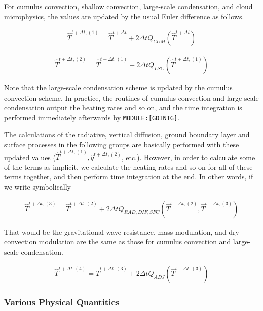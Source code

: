 For cumulus convection, shallow convection, large-scale condensation, and cloud microphysics, the values are updated by the usual Euler difference as follows.

\begin{eqnarray}
  \hat{T}^{t+\Delta t,(1)} = \hat{T}^{t+\Delta t}
                         +  2 \Delta t Q_{CUM}(\hat{T}^{t+\Delta t})
\end{eqnarray}

\begin{eqnarray}
  \hat{T}^{t+\Delta t,(2)} = \hat{T}^{t+\Delta t,(1)}
                         +  2 \Delta t Q_{LSC}(\hat{T}^{t+\Delta t,(1)})
\end{eqnarray}

Note that the large-scale condensation scheme is updated by the cumulus convection scheme. In practice, the routines of cumulus convection and large-scale condensation output the heating rates and so
on, and the time integration is performed immediately afterwards by \texttt{MODULE:{[}GDINTG{]}}.

The calculations of the radiative, vertical diffusion, ground boundary layer and surface processes in the following groups are basically performed with these updated values
(\(\hat{T}^{t+\Delta t,(1)}, \hat{q}^{t+\Delta t,(2)}\), etc.). However, in order to calculate some of the terms as implicit, we calculate the heating rates and so on for all of these terms together,
and then perform time integration at the end. In other words, if we write symbolically

\begin{eqnarray}
  \hat{T}^{t+\Delta t,(3)} = \hat{T}^{t+\Delta t,(2)}
              + 2 \Delta t Q_{RAD,DIF,SFC}
               (\hat{T}^{t+\Delta t,(2)},\hat{T}^{t+\Delta t,(3)})
\end{eqnarray}

That would be the gravitational wave resistance, mass modulation, and dry convection modulation are the same as those for cumulus convection and large-scale condensation.

\begin{eqnarray}
  \hat{T}^{t+\Delta t,(4)} = \hat{T}^{t+\Delta t,(3)}
              +  2 \Delta t Q_{ADJ}(\hat{T}^{t+\Delta t,(3)})
\end{eqnarray}

\hypertarget{various-physical-quantities}{%
\subsubsection{Various Physical Quantities}\label{various-physical-quantities}}

